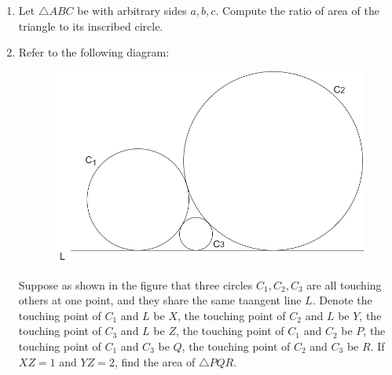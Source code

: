 \documentclass[12pt]{article}
\begin{document}
    \begin{enumerate}
        \item Let $\triangle ABC$ be with arbitrary sides $a,b,c$. Compute the ratio of area of the triangle to its inscribed circle. 
        \item Refer to the following diagram:
        \begin{figure}[H]
            \centering
            \includegraphics[scale=0.5]{cotangent_circles.png}
        \end{figure}
        Suppose as shown in the figure that three circles $C_1,C_2,C_3$ are all touching others at one point, and they share the same taangent line $L$. Denote the touching point of $C_1$ and $L$ be $X$, the touching point of $C_2$ and $L$ be $Y$, the touching point of $C_3$ and $L$ be $Z$, the touching point of $C_1$ and $C_2$ be $P$, the touching point of $C_1$ and $C_3$ be $Q$, the touching point of $C_2$ and $C_3$ be $R$. If $XZ=1$ and $YZ=2$, find the area of $\triangle PQR$. 
    \end{enumerate}
\end{document}
